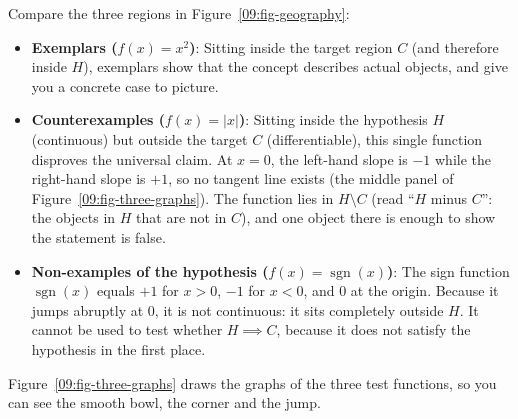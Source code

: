Compare the three regions in Figure~\ref{09:fig-geography}:
\begin{itemize}
\item \textbf{Exemplars ($f(x) = x^2$)}: Sitting inside the target region $C$ (and therefore inside $H$), exemplars show that the concept describes actual objects, and give you a concrete case to picture.
\item \textbf{Counterexamples ($f(x) = |x|$)}: Sitting inside the hypothesis $H$ (continuous) but outside the target $C$ (differentiable), this single function disproves the universal claim. At $x = 0$, the left-hand slope is $-1$ while the right-hand slope is $+1$, so no tangent line exists (the middle panel of Figure~\ref{09:fig-three-graphs}). The function lies in $H \setminus C$ (read ``$H$ minus $C$'': the objects in $H$ that are not in $C$), and one object there is enough to show the statement is false.
\item \textbf{Non-examples of the hypothesis ($f(x) = \operatorname{sgn}(x)$)}: The sign function $\operatorname{sgn}(x)$ equals $+1$ for $x > 0$, $-1$ for $x < 0$, and $0$ at the origin. Because it jumps abruptly at $0$, it is not continuous: it sits completely outside $H$. It cannot be used to test whether $H \implies C$, because it does not satisfy the hypothesis in the first place.
\end{itemize}

Figure~\ref{09:fig-three-graphs} draws the graphs of the three test functions, so you can see the smooth bowl, the corner and the jump.

